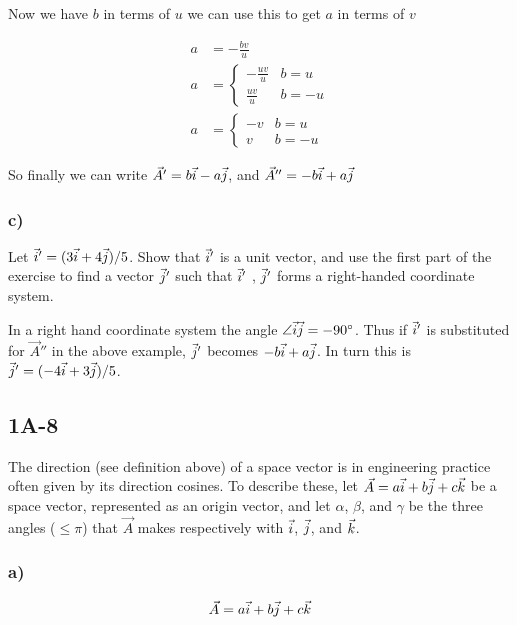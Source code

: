 \documentclass[main.tex]{subfiles}
\begin{document}
Now we have $b$ in terms of $u$ we can use this to get $a$ in terms
of $v$

\begin{align*}
a &= -\frac{bv}{u}\\
a &= \begin{cases}
      -\frac{uv}{u} & b= u \\
      \frac{uv}{u} & b= -u
   \end{cases}\\
a &= \begin{cases}
      -v & b= u \\
      v & b= -u
   \end{cases}
\end{align*}

So finally we can write $\vec{A}' = b\vec{i} - a\vec{j}$, and $\vec{A}'' = -b
\vec{i} + a\vec{j}$


\subsubsection*{c)}
Let $\vec{i}' =(3\vec{i} +4\vec{j})/5$. Show that $\vec{i}'$
is a unit vector, and use the first part of the exercise to find a vector $
\vec{j}'$ such that $\vec{i}'$ , $\vec{j}'$ forms a right-handed coordinate system.

In a right hand coordinate system the angle $\angle\vec{i}\vec{j} = \ang{-90}$.
Thus if $\vec{i}'$ is substituted for $\vec{A}''$ in the above example, $
\vec{j}'$ becomes $-b\vec{i} + a\vec{j}$.
In turn this is $\vec{j}' = (-4\vec{i} + 3\vec{j})/5$.

\subsection*{1A-8}

The direction (see definition above) of a space vector is in
engineering practice often given by its direction cosines. To
describe these, let $\vec{A} = a\vec{i} + b\vec{j} + c\vec{k}$ be a space
vector, represented as an origin vector, and let $\alpha$, $\beta$,
and $\gamma$ be the three angles ($\leq\pi$) that $\vec{A}$ makes
respectively with $\vec{i}$, $\vec{j}$, and $\vec{k}$.

\subsubsection*{a)}

\begin{equation*}
\vec{A} = a\vec{i} + b\vec{j} +c\vec{k}
\end{equation*}
\end{document}
